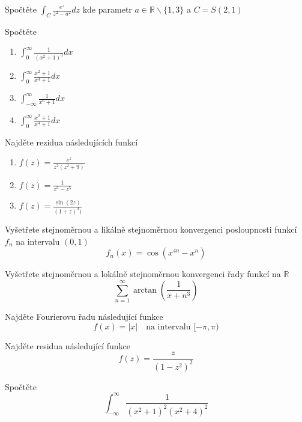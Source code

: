 \begin{multicols}{2}
Spočtěte $\int_C \frac{e^z}{z^2 - a^2} dz$ kde parametr $a \in \mathbb{R} \backslash \{ 1, 3 \}$ a $C = S(2,1)$

\separator

Spočtěte
\begin{enumerate}
\item $\int_0^\infty \frac{1}{(x^2 + 1)^3} dx$
\item $\int_0^\infty \frac{x^2 + 1}{x^4 + 1} dx$
\item $\int_{-\infty}^\infty \frac{1}{x^6 + 1} dx$
\item $\int_0^\infty \frac{x^2 + 1}{x^4 + 1} dx$
\end{enumerate}
 
\separator

Najděte rezidua následujících funkcí
\begin{enumerate}
\item $f(z) = \frac{e^z}{z^2 (z^2 + 9)}$
\item $f(z) = \frac{1}{z^3 - z^5}$
\item $f(z) = \frac{\sin (2z)}{(1+z)^3)}$
\end{enumerate}

\separator

Vyšetřete stejnoměrnou a likálně stejnoměrnou konvergenci posloupnosti funkcí $f_n$ na intervalu $(0,1)$
$$f_n(x) = \cos \left( x^{4n} - x^{n} \right)$$

\separator

Vyšetřete stejnoměrnou a lokálně stejnoměrnou konvergenci řady funkcí na $\mathbb{R}$
$$\sum_{n=1}^\infty \arctan \left( \frac{1}{x + n^3} \right)$$

\separator

Najděte Fourierovu řadu následující funkce
$$f(x) = | x | \quad \textrm{na intervalu } [-\pi,\pi)$$

\separator

Najděte residua následující funkce
$$f(z) = \frac{z}{\left( 1 - z^2 \right)^2}$$

\separator

Spočtěte
$$\int_{-\infty}^\infty \frac{1}{\left( x^2 + 1 \right)^2 \left( x^2 + 4 \right)^2}$$

\end{multicols}
